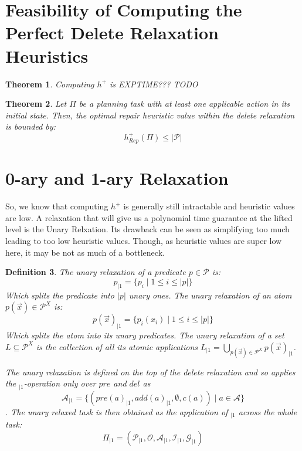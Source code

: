 \documentclass[twocolumn]{article}
\newcommand{\task}{\ensuremath{\Pi}\xspace}
\newcommand{\preds}{\ensuremath{\mathcal{P}}\xspace}
\newcommand{\acts}{\ensuremath{\mathcal{A}}\xspace}
\newcommand{\objects}{\ensuremath{\mathcal{O}}\xspace}
\newcommand{\init}{\ensuremath{\mathcal{I}}\xspace}
\newcommand{\goal}{\ensuremath{\mathcal{G}}\xspace}
\newcommand{\vars}{\ensuremath{X}\xspace}
\newcommand{\someVar}{\ensuremath{x}\xspace}
\newcommand{\atoms}{\ensuremath{\preds^{\vars}}\xspace}
\newcommand{\someAtom}{\ensuremath{p(\vec{\someVar})}\xspace}
\newcommand{\someLiftedSet}{\ensuremath{L}\xspace}
\newcommand{\somePred}{\ensuremath{p}\xspace}
\newcommand{\prename}{\ensuremath{pre}\xspace}
\newcommand{\addname}{\ensuremath{add}\xspace}
\newcommand{\delname}{\ensuremath{del}\xspace}
\newcommand{\pre}[1]{\ensuremath{\prename(#1)}\xspace}
\newcommand{\add}[1]{\ensuremath{\addname(#1)}\xspace}
\newcommand{\arity}[1]{\ensuremath{|#1|}}
\newcommand{\cost}[1]{\ensuremath{c(#1)}\xspace}
\newcommand{\someAct}{\ensuremath{a}\xspace}
\newcommand{\optimalHeuristicRel}{\ensuremath{h^{+}_{Rep}}\xspace}
\newcommand{\unary}[1]{\ensuremath{#1_{|1}}\xspace}
\newtheorem{theorem}{Theorem}
\newtheorem{definition}[theorem]{Definition}
\begin{document}
	\section{Feasibility of Computing the Perfect Delete Relaxation Heuristics}
	
	
	
	\begin{theorem}
		Computing $h^+$ is EXPTIME??? TODO
	\end{theorem}
	
	
	
	\begin{theorem}
		Let \task be a planning task with at least one applicable action in its initial state.
		Then, the optimal repair heuristic value within the delete relaxation is bounded by:
		$$\optimalHeuristicRel(\task) \leq  \arity{\preds}$$
	\end{theorem}
	
	
	
	\section{0-ary and 1-ary Relaxation}
	
	So, 
	we know that computing $h^{+}$ 
	is generally still intractable and heuristic values are low.
	A relaxation that will give us a polynomial time guarantee at the lifted level is the Unary Relxation.
	Its drawback can be seen as simplifying too much leading to too low heuristic values.
	Though, as heuristic values are super low here, it may be not as much of a bottleneck.
	
	\begin{definition}
		The unary relaxation of a predicate $\somePred \in \preds$ is:
		$$
		\unary{\somePred} = \{\somePred_i \mid 1 \leq i \leq \arity{\somePred}\}
		$$
		Which splits the predicate into \arity{\somePred} unary ones.
		The unary relaxation of an atom $\someAtom \in \atoms$ is:
		$$
		\unary{\someAtom} =  \{\somePred_i(\someVar_i) \mid 1 \leq i \leq \arity{\somePred}\}
		$$
		Which splits the atom into its unary predicates.
		The unary relaxation of a set $\someLiftedSet \subseteq \atoms$ is the collection of all its atomic applications
		$
		\unary{\someLiftedSet} =  \bigcup_{\someAtom \in \atoms} \unary{\someAtom}
		$.
		
		The unary relaxation is defined on the top of the delete relaxation and so applies the {$\unary{}$}-operation only over \prename and \delname as
		$$
		\unary{\acts} = \{(\unary{\pre{\someAct}}, \unary{\add{\someAct}}, \emptyset, \cost{\someAct}) \mid \someAct \in \acts\}
		$$.
		The unary relaxed task is then obtained as the application of $\unary{}$ across the whole task:
		$$
		\unary{\task} = (\unary{\preds}, \objects, \unary{\acts}, \unary{\init}, \unary{\goal})
		$$
	\end{definition}
	
\end{document}
